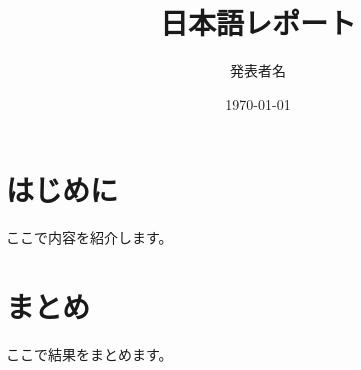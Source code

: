 \documentclass[12pt]{report}
\title{日本語レポート}
\author{発表者名}
\date{\today}
\begin{document}
\maketitle
\tableofcontents

\chapter{はじめに}
ここで内容を紹介します。

\chapter{まとめ}
ここで結果をまとめます。

% 
\end{document}
